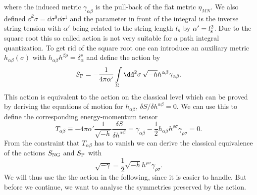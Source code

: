%
%
where the induced metric $\gamma_{\alpha\beta}$ is the pull-back of the flat  metric $\eta_{MN}$. We also defined $\dd^{2}\sigma = \dd\sigma^{0}\dd\sigma^{1}$ and the parameter in front of the integral is the inverse string tension with $\alpha'$ being related to the string length $l_{\rm s}$ by $\alpha'=l_{\rm s}^{2}$. Due to the square root this so called  action is not very suitable for a path integral quantization. To get rid of the square root one can introduce an auxiliary metric $h_{\alpha\beta}(\sigma)$ with $h_{\alpha\beta}h^{\beta\rho}=\delta_{\alpha}^{\rho}$ and define the  action by
%
%
\begin{equation}
S_{\rm P} = -\frac{1}{4\pi\alpha'} \int\limits_{\Sigma}\dd^{2}\sigma\, \sqrt{-h}h^{\alpha\beta}\gamma_{\alpha\beta}.
\end{equation}
%
%
This action is equivalent to the  action on the classical level which can be proved by deriving the equations of motion for $h_{\alpha\beta}$, $\delta S/ \delta h^{\alpha\beta} = 0$. We can use this to define the corresponding energy-momentum tensor
%
%
\begin{equation}
T_{\alpha\beta} \equiv -4\pi\alpha' \frac{1}{\sqrt{-h}} \frac{\delta S}{\delta h^{\alpha\beta}} = \gamma_{\alpha\beta} - \frac{1}{2} h_{\alpha\beta} h^{\rho\sigma}\gamma_{\rho\sigma} = 0.
\end{equation}
%
%
From the constraint that $T_{\alpha\beta}$ has to vanish we can derive the classical equivalence of the actions $S_{\rm NG}$ and $S_{\rm P}$ with
%
%
\begin{equation}
\sqrt{-\gamma} = \frac{1}{2} \sqrt{-h} h^{\rho\sigma} \gamma_{\rho\sigma}.
\end{equation}
%
%
We will thus use the the  action in the following, since it is easier to handle. But before we continue, we want to analyse the symmetries preserved by the  action.
%
%
